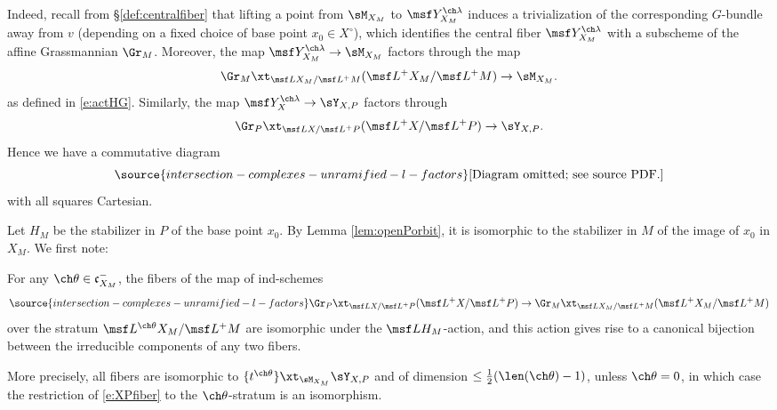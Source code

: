 Indeed, recall from \S \ref{def:centralfiber} that lifting a point from $\sM_{X_M}$ to $\msf Y^{\ch\lambda}_{X_M}$ induces a trivialization of the corresponding $G$-bundle away from $v$ (depending on a fixed choice of base point $x_0\in X^\circ$), which identifies the central fiber $\msf Y^{\ch\lambda}_{X_M}$ with a subscheme of the affine Grassmannian $\Gr_M$. Moreover, the map $\msf Y^{\ch\lambda}_{X_M} \to \sM_{X_M}$ factors through the map
\[ \Gr_M \xt_{\msf L X_M / \msf L^+M} (\msf L^+ X_M / \msf L^+M) \to \sM_{X_M}.\]
as defined in \eqref{e:actHG}.
Similarly, the map $\msf Y^{\ch\lambda}_X \to \sY_{X,P}$ factors through
\[\Gr_P \xt_{\msf L X / \msf L^+P} (\msf L^+ X / \msf L^+P) \to \sY_{X,P}.\]
Hence we have a commutative diagram
\begin{equation} \label{e:YXPM2}
\source{intersection-complexes-unramified-l-factors}
\text{[Diagram omitted; see source PDF.]}
\end{equation}
with all squares Cartesian.


Let $H_M$ be the stabilizer in $P$ of the base point $x_0$. By Lemma \ref{lem:openPorbit}, it is isomorphic to the stabilizer in $M$ of the image of $x_0$ in $X_M$. We first note:

\begin{lem}
\notready  \label{lem:XPfiber}
For any $\ch\theta \in \mathfrak c_{X_M}^-$, the fibers of the map of ind-schemes
\begin{equation}\label{e:XPfiber}
\source{intersection-complexes-unramified-l-factors}
   \Gr_P \xt_{\msf L X / \msf L^+P} (\msf L^+ X / \msf L^+P) \to \Gr_M \xt_{\msf L X_M / \msf L^+M} (\msf L^+ X_M / \msf L^+M)
\end{equation}
over the stratum $\msf L^{\ch\theta} X_M / \msf L^+M$ are isomorphic under the $\msf LH_M$-action, and this action gives rise to a canonical bijection between the irreducible components of any two fibers.

More precisely, all fibers are isomorphic to $\{t^{\ch\theta}\} \xt_{\sM_{X_M}} \sY_{X,P}$ and of dimension $\le \frac 1 2 (\len(\ch\theta)-1)$, unless $\ch\theta = 0$, in which case the restriction of \eqref{e:XPfiber} to the $\ch\theta$-stratum is an isomorphism.
\end{lem}


